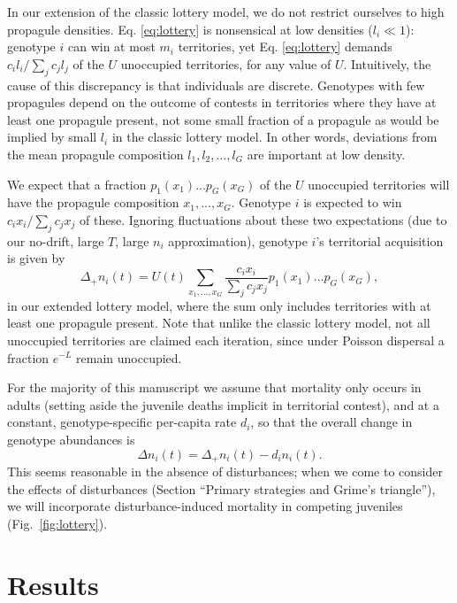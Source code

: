 \documentclass[11pt]{article}
\begin{document}
In our extension of the classic lottery model, we do not restrict ourselves to high propagule densities. Eq. \eqref{eq:lottery} is nonsensical at low densities ($l_i\ll 1$): genotype $i$ can win at most $m_i$ territories, yet Eq. \eqref{eq:lottery} demands $c_i l_i/\sum_j c_j l_j$ of the $U$ unoccupied territories, for any value of $U$. Intuitively, the cause of this discrepancy is that individuals are discrete. Genotypes with few propagules depend on the outcome of contests in territories where they have at least one propagule present, not some small fraction of a propagule as would be implied by small $l_i$ in the classic lottery model. In other words, deviations from the mean propagule composition $l_1,l_2,\ldots,l_G$ are important at low density. 

We expect that a fraction $p_1(x_1)\ldots p_G(x_G)$ of the $U$ unoccupied territories will have the propagule composition $x_1,\ldots,x_G$. Genotype $i$ is expected to win $c_i x_i/\sum_j c_j x_j$ of these. Ignoring fluctuations about these two expectations (due to our no-drift, large $T$, large $n_i$ approximation), genotype $i$'s territorial acquisition is given by
\begin{equation}
\Delta_+ n_i(t)=U(t)\sum_{x_1,\ldots,x_G} \frac{c_i x_i}{\sum_j c_j x_j} p_1(x_1)\ldots p_G(x_G), \label{eq:growthsumuncoupled}
\end{equation}
in our extended lottery model, where the sum only includes territories with at least one propagule present. Note that unlike the classic lottery model, not all unoccupied territories are claimed each iteration, since under Poisson dispersal a fraction $e^{-L}$ remain unoccupied.

For the majority of this manuscript we assume that mortality only occurs in adults (setting aside the juvenile deaths implicit in territorial contest), and at a constant, genotype-specific per-capita rate $d_i$, so that the overall change in genotype abundances is
\begin{equation}
\Delta n_i(t)=\Delta_+ n_i(t)-d_i n_i(t). \label{eq:delttot}
\end{equation}
This seems reasonable in the absence of disturbances; when we come to consider the effects of disturbances (Section ``Primary strategies and Grime's triangle''), we will incorporate disturbance-induced mortality in competing juveniles (Fig.~\ref{fig:lottery}).   

\section*{Results}
\end{document}
